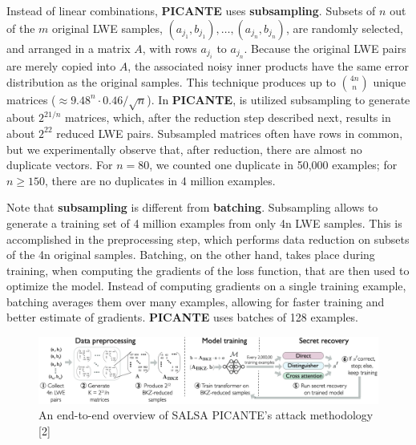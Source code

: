 \documentclass{article}
\begin{document}
Instead of linear combinations, \textbf{PICANTE} uses \textbf{subsampling}. Subsets of $n$ out of the $m$ original LWE samples, $(a_{j_1}, b_{j_1}), \ldots, (a_{j_n}, b_{j_n})$, are randomly selected, and arranged in a matrix $A$, with rows $a_{j_i}$ to $a_{j_n}$. Because the original LWE pairs are merely copied into $A$, the associated noisy inner products have the same error distribution as the original samples. This technique produces up to $\binom{4n}{n}$ unique matrices ($\approx 9.48^n \cdot 0.46 / \sqrt{n}$). In \textbf{PICANTE}, is utilized subsampling to generate about $2^{21/n}$ matrices, which, after the reduction step described next, results in about $2^{22}$ reduced LWE pairs. Subsampled matrices often have rows in common, but we experimentally observe that, after reduction, there are almost no duplicate vectors. For $n = 80$, we counted one duplicate in 50,000 examples; for $n \geq 150$, there are no duplicates in 4 million examples.

Note that \textbf{subsampling} is different from \textbf{batching}. Subsampling allows to generate a training set of 4 million examples from only 4n LWE samples. This is accomplished in the preprocessing step, which performs data reduction on subsets of the 4n original samples. Batching, on the other hand, takes place during training, when computing the gradients of the loss function, that are then used to optimize the model. Instead of computing gradients on a single training example, batching averages them over many examples, allowing for faster training and better estimate of gradients. \textbf{PICANTE} uses batches of 128 examples.

\begin{figure}[h]
    \centering
    \includegraphics[width=1\textwidth]{Materials/SALSA_PICANTE_Attack_methodology.png}
    \caption{An end-to-end overview of SALSA PICANTE's attack methodology [2]}
    \label{fig:salsa_flowchart}
\end{figure}
\end{document}
